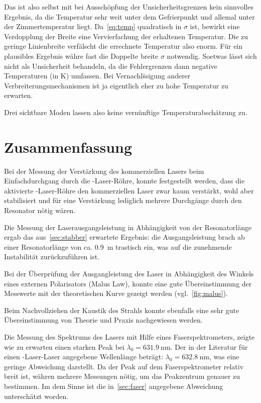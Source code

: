 \documentclass[slug=GL, room=HZDR\ Dresden/Rossendorf\,\ Geb.\ 620/123, supervisor=Tim\ Ziegler]{../../Lab_Report_LaTeX/lab_report}
\newcommand{\hne}{\ce{HeNe}-Laser}
\begin{document}
Das ist also selbst mit bei Aussch\"opfung der Unsicherheitsgrenzen kein
sinnvolles Ergebnis, da die Temperatur sehr weit unter dem
Gefrierpunkt und allemal unter der Zimmertemperatur
liegt. Da~\ref{eq:temp} quadratisch in \(\sigma\) ist, bewirkt eine
Verdopplung der Breite eine Vervierfachung der erhaltenen
Temperatur. Die zu geringe Linienbreite verf\"alscht die errechnete
Temperatur also enorm. F\"ur ein plausibles Ergebnis w\"ahre fast die
Doppelte breite \(\sigma\) notwendig. Soetwas l\"asst sich nicht als
Unsicherheit behandeln, da die Fehlergrenzen dann negative
Temperaturen (in \si{\kelvin}) umfassen. Bei Vernachl\"ssigung anderer
Verbreiterungsmechanismen ist ja eigentlich eher zu hohe Temperatur zu
erwarten.

Drei sichtbare Moden lassen also keine vern\"unftige
Temperaturabsch\"atzung zu.

\section {Zusammenfassung}
\label{sec:zusfass}
Bei der Messung der Verstärkung des kommerziellen Lasers beim
Einfachdurchgang durch die \hne{}-Röhre, konnte festgestellt werden,
dass die aktivierte \hne{}-Röhre den kommerziellen Laser zwar kaum
verstärkt, wohl aber stabilisiert und für eine Verstärkung lediglich
mehrere Durchgänge durch den Resonator nötig wären.

Die Messung der Laserausgangsleistung in Abhängigkeit von der
Resonatorlänge ergab das aus~\ref{sec:stabber} erwartete Ergebnis:
die Ausgangsleistung brach ab einer Resonatorlänge von
ca. \SI{0,9}{\meter} trastisch ein, was auf die zunehmende
Instabilität zurückzuführen ist.

Bei der Überprüfung der Ausgangleistung des Laser in Abhängigkeit des
Winkels eines externen Polarisators (Malus Law), konnte eine gute
Übereinstimmung der Messwerte mit der theoretischen Kurve gezeigt
werden (vgl.~\ref{fig:malus}).

Beim Nachvollziehen der Kaustik des Strahls konnte ebenfalls eine sehr
gute Übereinstimmung von Theorie und Praxis nachgewiesen werden.

Die Messung des Spektrums des Lasers mit Hilfe eines
Faserspektrometers, zeigte wie zu erwarten einen starken Peak bei
\(\lambda_0=\SI{631.9}{\nano\meter}\).  Der in der Literatur für einen
\hne-Laser angegebene Wellenlänge beträgt:
\(\lambda_0=\SI{632.8}{\nano\meter}\), was eine geringe Abweichung
darstellt. Da der Peak auf dem Faserspektrometer relativ breit ist,
w\"ahren mehrere Messungen n\"otig, um das Peakzentrum genauer zu
bestimmen. Im dem Sinne ist die in~\ref{sec:faser} angegebene
Abweichung untersch\"atzt worden.
\end{document}
